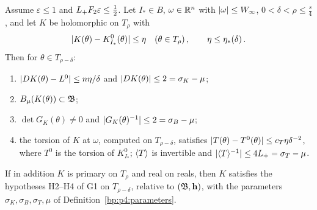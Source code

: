 \begin{theorem}[STAB]\label{bp:p4:stab}
Assume $\varepsilon\le1$ and $L_{+} F_2\varepsilon\le\frac12$. Let $I_*\in B$, $\omega\in\mathbb{R}^n$
with $\lvert \omega\rvert\le W_\infty$, $0<\delta<\rho\le\frac s4$, and let $K$ be holomorphic on $T_\rho$ with
\begin{equation*}
\lvert K(\theta)-K^0_{I_*}(\theta)\rvert\le\eta\quad(\theta\in T_\rho)\,,\qquad\eta\le\eta_*(\delta)\,.
\end{equation*}
Then for $\theta\in T_{\rho-\delta}$:
\begin{enumerate}[label=(\alph*)]
\item $\lvert DK(\theta)-L^0\rvert\le n\eta/\delta$ and $\lvert DK(\theta)\rvert\le2=\sigma_K-\mu$;
\item $B_\mu(K(\theta))\subset\mathfrak{B}$;
\item $\det G_K(\theta)\ne0$ and $\lvert G_K(\theta)^{-1}\rvert\le2=\sigma_B-\mu$;
\item the torsion of $K$ at $\omega$, computed on $T_{\rho-\delta}$, satisfies
  $\lvert T(\theta)-T^0(\theta)\rvert\le c_T\eta\delta^{-2}$, where $T^0$ is the torsion of $K^0_{I_*}$;
  $\langle T\rangle$ is invertible and $\lvert \langle T\rangle^{-1}\rvert\le4L_{+}=\sigma_T-\mu$.
\end{enumerate}
If in addition $K$ is primary on $T_\rho$ and real on reals, then $K$ satisfies the hypotheses
H2--H4 of G1 on $T_{\rho-\delta}$, relative to $(\mathfrak{B},\mathbf{h})$, with the parameters
$\sigma_K,\sigma_B,\sigma_T,\mu$ of Definition~\ref{bp:p4:parameters}.
\end{theorem}

